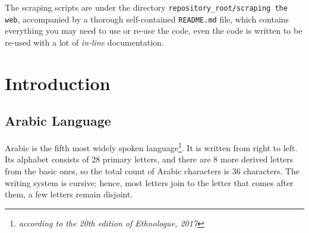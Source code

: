 \documentclass[12pt]{report}
\begin{document}
The scraping scripts are under the directory \texttt{repository\_root/scraping
the web}, accompanied by  a thorough self-contained \texttt{README.md} file,
which contains everything you may need to use or re-use the code, even the code
is written to be re-used with a lot of  \textit{in-line} documentation.























\section*{Introduction}
\subsection*{Arabic Language}

Arabic is the fifth most widely spoken language\footnote{\textit{according to the
20th edition of Ethnologue, 2017}}. It is written from right to left. Its
alphabet consists of 28 primary letters, and there are 8 more derived letters
from the basic ones, so the total count of Arabic characters is 36 characters.
The writing system is cursive; hence, most letters join to the letter that comes
after them, a few letters remain disjoint.
\end{document}

